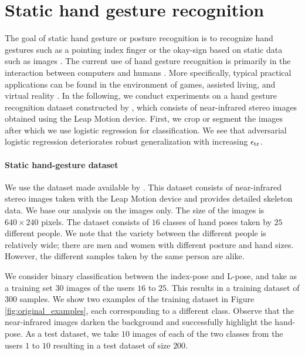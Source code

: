 \section{Static hand gesture recognition}
\label{sec:handgestures}

The goal of static hand gesture or posture recognition is to recognize hand gestures such as a pointing index finger or the okay-sign based on static data such as images \cite{Oudah20, Yang13}. The current use of hand gesture recognition is primarily in the interaction between computers and humans \cite{Oudah20}. More specifically, typical practical applications can be found in the environment of games, assisted living, and virtual reality \cite{Mujahid21}. In the following, we conduct experiments on a hand gesture recognition dataset constructed by \cite{Mantecon19}, which consists of near-infrared stereo images obtained using the Leap Motion device. First, we crop or segment the images after which we use logistic regression for classification. We see that adversarial logistic regression deteriorates robust generalization with increasing $\epsilon_{\text{tr}}$.

\paragraph{Static hand-gesture dataset}
We use the dataset made available by \cite{Mantecon19}. This dataset consists of near-infrared stereo images taken with the Leap Motion device and provides detailed skeleton data. We base our analysis on the images only. The size of the images is $640 \times 240$ pixels. The dataset consists of $16$ classes of hand poses taken by $25$ different people. We note that the variety between the different people is relatively wide; there are men and women with different posture and hand sizes. However, the different samples taken by the same person are alike.

We consider binary classification between the index-pose and L-pose, and take as a training set $30$ images of the users $16$ to $25$. This results in a training dataset of $300$ samples. We show two examples of the training dataset in Figure \ref{fig:original_examples}, each corresponding to a different class. Observe that the near-infrared images darken the background and successfully highlight the hand-pose. As a test dataset, we take $10$ images of each of the two classes from the users $1$ to $10$ resulting in a test dataset of size $200$.

